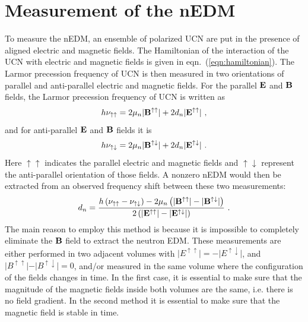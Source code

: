 \section{Measurement of the nEDM\label{sec:nedmmeasurement}}
To measure the nEDM, an ensemble of polarized UCN are put in the
presence of aligned electric and magnetic fields. The Hamiltonian of
the interaction of the UCN with electric and magnetic fields is given
in eqn.~(\ref{eqn:hamiltonian}). The Larmor precession frequency of
UCN is then measured in two orientations of parallel and anti-parallel
electric and magnetic fields. For the parallel $\bf{E}$ and $\bf{B}$
fields, the Larmor precession frequency of UCN is written as
\begin{equation}
\label{eqn:parallelEandB}
  h \nu_{\uparrow \uparrow} = 2 \mu_n \vert {\bf{B^{\uparrow \uparrow}}} \vert+ 2 d_n\vert \bf{ E^{\uparrow \uparrow}} \vert~,
\end{equation}
and for anti-parallel  $\bf{E}$ and $\bf{B}$ fields it is
\begin{equation}
\label{eqn:antiparallelEandB}
h \nu_{\uparrow \downarrow} = 2 \mu_n \vert {\bf{B^{\uparrow \downarrow}}} \vert+ 2 d_n\vert \bf{ E^{\uparrow \downarrow}} \vert~.
\end{equation}
Here $\uparrow \uparrow$ indicates the parallel electric and magnetic
fields and $\uparrow \downarrow$ represent the anti-parallel
orientation of those fields.  A nonzero nEDM would then be extracted
from an observed frequency shift between these two measurements:
\begin{equation}
  \label{eqn:dn}
  d_n = \frac{h \left( \nu_{\uparrow \uparrow} - \nu_{\uparrow \downarrow} \right) - 2 \mu_n \left( \vert {\bf{B^{\uparrow \uparrow}}} \vert -\vert {\bf{B^{\uparrow \downarrow}}} \vert \right)}{2 \left(\vert \bf{ E^{\uparrow \uparrow}} \vert - \vert \bf{ E^{\uparrow \downarrow}} \vert \right)}~.
\end{equation}
The main reason to employ this method is because it is impossible to
completely eliminate the $\bf{B}$ field to extract the neutron
EDM. These measurements are either performed in two adjacent volumes
with
$\vert E^{\uparrow \uparrow} \vert = - \vert E^{\uparrow \downarrow}
\vert$, and
$\vert B^{\uparrow \uparrow}\vert - \vert B^{\uparrow \downarrow}
\vert= 0 $, and/or measured in the same volume where the configuration
of the fields changes in time. In the first case, it is essential to
make sure that the magnitude of the magnetic fields inside both
volumes are the same, i.e. there is no field gradient. In the
second method it is essential to make sure that the magnetic field is
stable in time.


